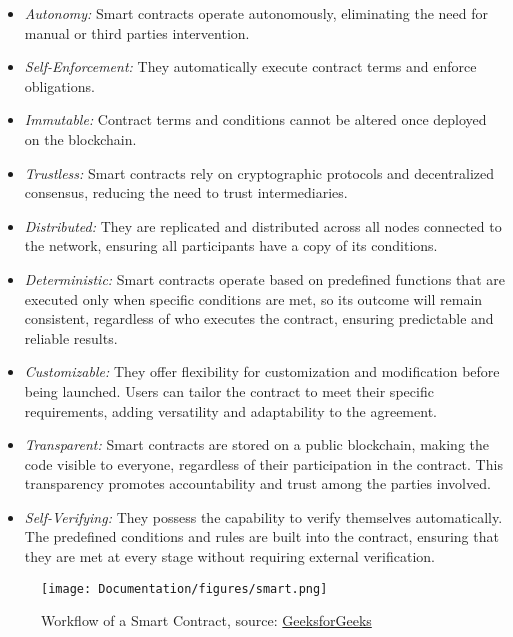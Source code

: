 \begin{itemize}
    \item \textit{Autonomy:} Smart contracts operate autonomously, eliminating the need for manual or third parties intervention.
    \item \textit{Self-Enforcement:} They automatically execute contract terms and enforce obligations.
    \item \textit{Immutable:} Contract terms and conditions cannot be altered once deployed on the blockchain.
    \item \textit{Trustless:} Smart contracts rely on cryptographic protocols and decentralized consensus, reducing the need to trust intermediaries.
    \item \textit{Distributed:} They are replicated and distributed across all nodes connected to the network, ensuring all participants have a copy of its conditions.
    \item \textit{Deterministic:} Smart contracts operate based on predefined functions that are executed only when specific conditions are met, so its outcome will remain consistent, regardless of who executes the contract, ensuring predictable and reliable results.
    \item \textit{Customizable:} They offer flexibility for customization and modification before being launched. Users can tailor the contract to meet their specific requirements, adding versatility and adaptability to the agreement.
    \item \textit{Transparent:} Smart contracts are stored on a public blockchain, making the code visible to everyone, regardless of their participation in the contract. This transparency promotes accountability and trust among the parties involved.
    \item \textit{Self-Verifying:} They possess the capability to verify themselves automatically. The predefined conditions and rules are built into the contract, ensuring that they are met at every stage without requiring external verification.\cite{sc}
    
\end{itemize}


\begin{figure}[htbp]
	\centering
	\texttt{[image: Documentation/figures/smart.png]}  %
	\caption{Workflow of a Smart Contract, source: \href{https://www.geeksforgeeks.org/smart-contracts-in-blockchain/}{GeeksforGeeks}}
	\label{fig:smartcont}
\end{figure}

